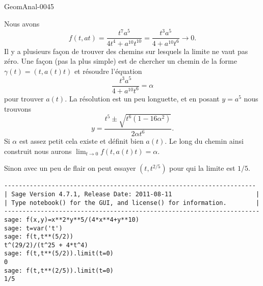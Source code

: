 \begin{corrige}{GeomAnal-0045}

            Nous avons
            \begin{equation}
                f(t,at)=\frac{ t^7a^5 }{ 4t^4+a^{10}t^{10} }=\frac{ t^3a^5 }{ 4+a^{10}t^6 }\to 0.
            \end{equation}
            Il y a plusieurs façon de trouver des chemins sur lesquels la limite ne vaut pas zéro. Une façon (pas la plus simple) est de chercher un chemin de la forme \( \gamma(t)=(t,a(t)t)\) et résoudre l'équation
            \begin{equation}
                \frac{ t^3a^5 }{ 4+a^{10}t^6 }=\alpha               
            \end{equation}
            pour trouver \( a(t)\). La résolution est un peu longuette, et en posant \( y=a^5\) nous trouvons
            \begin{equation}
                y=\frac{ t^5\pm\sqrt{t^6(1-16\alpha^2)} }{ 2\alpha t^6 }.
            \end{equation}
            Si \( \alpha\) est assez petit cela existe et définit bien \( a(t)\). Le long du chemin ainsi construit nous aurons \( \lim_{t\to 0} f(t,a(t)t)=\alpha\).

            Sinon avec un peu de flair on peut essayer \( (t,t^{2/5})\) pour qui la limite est \( 1/5\).

            \begin{verbatim}
---------------------------------------------------------------------
| Sage Version 4.7.1, Release Date: 2011-08-11                       |
| Type notebook() for the GUI, and license() for information.        |
----------------------------------------------------------------------
sage: f(x,y)=x**2*y**5/(4*x**4+y**10)
sage: t=var('t')
sage: f(t,t**(5/2))
t^(29/2)/(t^25 + 4*t^4)
sage: f(t,t**(5/2)).limit(t=0)
0
sage: f(t,t**(2/5)).limit(t=0)
1/5
            \end{verbatim}

\end{corrige}
